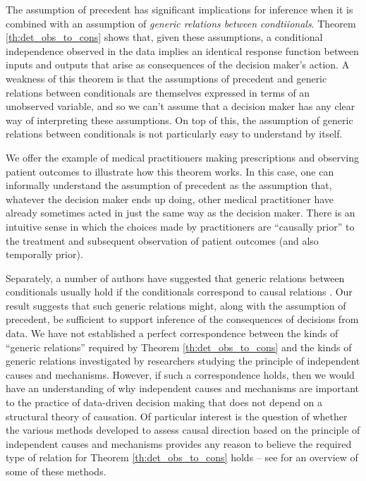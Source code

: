 The assumption of precedent has significant implications for inference when it is combined with an assumption of \emph{generic relations between condtiionals}. Theorem \ref{th:det_obs_to_cons} shows that, given these assumptions, a conditional independence observed in the data implies an identical response function between inputs and outputs that arise as consequences of the decision maker's action. A weakness of this theorem is that the assumptions of precedent and generic relations between conditionals are themselves expressed in terms of an unobserved variable, and so we can't assume that a decision maker has any clear way of interpreting these assumptions. On top of this, the assumption of generic relations between conditionals is not particularly easy to understand by itself.

We offer the example of medical practitioners making prescriptions and observing patient outcomes to illustrate how this theorem works. In this case, one can informally understand the assumption of precedent as the assumption that, whatever the decision maker ends up doing, other medical practitioner have already sometimes acted in just the same way as the decision maker. There is an intuitive sense in which the choices made by practitioners are ``causally prior'' to the treatment and subsequent observation of patient outcomes (and also temporally prior).

Separately, a number of authors have suggested that generic relations between conditionals usually hold if the conditionals correspond to causal relations \citep{meek_strong_1995,lemeire_replacing_2013}. Our result suggests that such generic relations might, along with the assumption of precedent, be sufficient to support inference of the consequences of decisions from data. We have not established a perfect correspondence between the kinds of ``generic relations'' required by Theorem \ref{th:det_obs_to_cons} and the kinds of generic relations investigated by researchers studying the principle of independent causes and mechanisms. However, if such a correspondence holds, then we would have an understanding of why independent causes and mechanisms are important to the practice of data-driven decision making that does not depend on a structural theory of causation. Of particular interest is the question of whether the various methods developed to assess causal direction based on the principle of independent causes and mechanisms provides any reason to believe the required type of relation for Theorem \ref{th:det_obs_to_cons} holds -- see \citep{mooij_j.m._distinguishing_2016} for an overview of some of these methods.

